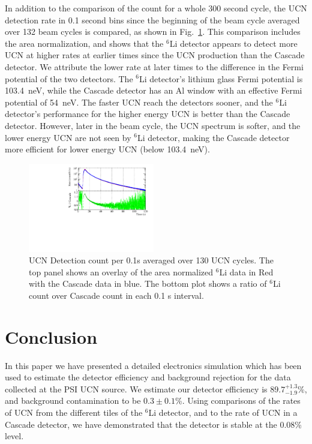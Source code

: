 \documentclass[letter,twocolumn,preprint,3p,numbers,sort&compress]{elsarticle}
\begin{document}
In addition to the comparison of the count for a whole 300 second
cycle, the UCN detection rate in 0.1 second bins since the beginning
of the beam cycle averaged over 132 beam cycles is compared, as shown
in Fig.~\ref{fig:averagedRate}.  This comparison includes the area
normalization, and shows that the $^{6}$Li detector appears to detect
more UCN at higher rates at earlier times since the UCN production
than the Cascade detector.  We attribute the lower rate at later times
to the difference in the Fermi potential of the two detectors.  The
$^6$Li detector's lithium glass Fermi potential is 103.4~neV, while
the Cascade detector has an Al window with an effective Fermi
potential of 54~neV.  The faster UCN reach the detectors sooner, and
the $^6$Li detector's performance for the higher energy UCN is better
than the Cascade detector.  However, later in the beam cycle, the UCN
spectrum is softer, and the lower energy UCN are not seen by $^{6}$Li
detector, making the Cascade detector more efficient for lower energy
UCN (below 103.4~neV).

\begin{figure}[!htpb]
\centering \includegraphics[width = 0.49\textwidth]{figures/cascade_to_li_130cycleavg.pdf}
\caption{UCN Detection count per 0.1s averaged over 130 UCN cycles.
  The top panel shows an overlay of the area normalized $^6$Li data in
  Red with the Cascade data in blue.  The bottom plot shows a ratio of
  $^6$Li count over Cascade count in each 0.1 s interval. }
\label{fig:averagedRate}
\end{figure}



\section{Conclusion}

In this paper we have presented a detailed electronics simulation
which has been used to estimate the detector efficiency and background
rejection for the data collected at the PSI UCN source.  We estimate
our detector efficiency is $89.7^{+1.3}_{-1.9}$\%, and background
contamination to be $0.3\pm0.1$\%.  Using comparisons of the rates of
UCN from the different tiles of the $^{6}$Li detector, and to the rate of
UCN in a Cascade detector, we have demonstrated that the detector is
stable at the 0.08\% level. 
\end{document}
